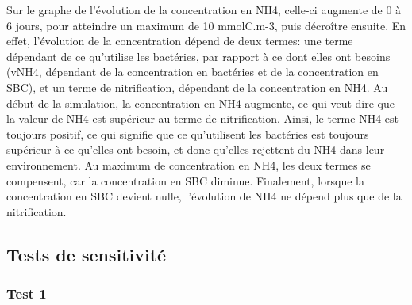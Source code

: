 \par{
Sur le graphe de l'\'evolution de la concentration en NH4, celle-ci augmente de 0 \`a 6 jours, pour atteindre
un maximum de 10 mmolC.m-3, puis d\'ecro\^itre ensuite. En effet, l'\'evolution de la concentration d\'epend
de deux termes: une terme d\'ependant de ce qu'utilise les bact\'eries, par rapport \`a ce dont elles ont
besoins (vNH4, d\'ependant de la concentration en bact\'eries et de la concentration en SBC), et un terme
de nitrification, d\'ependant de la concentration en NH4. Au d\'ebut de la simulation, la concentration en
NH4 augmente, ce qui veut dire que la valeur de NH4 est sup\'erieur au terme de nitrification. Ainsi, le terme
NH4 est toujours positif, ce qui signifie que ce qu'utilisent les bact\'eries est toujours sup\'erieur \`a ce
qu'elles ont besoin, et donc qu'elles rejettent du NH4 dans leur environnement. Au maximum de concentration
en NH4, les deux termes se compensent, car la concentration en SBC diminue. Finalement, lorsque la
concentration en SBC devient nulle, l'\'evolution de NH4 ne d\'epend plus que de la nitrification.
}

\FloatBarrier
\newpage
\subsection{Tests de sensitivit\'e}
\subsubsection{Test 1}

